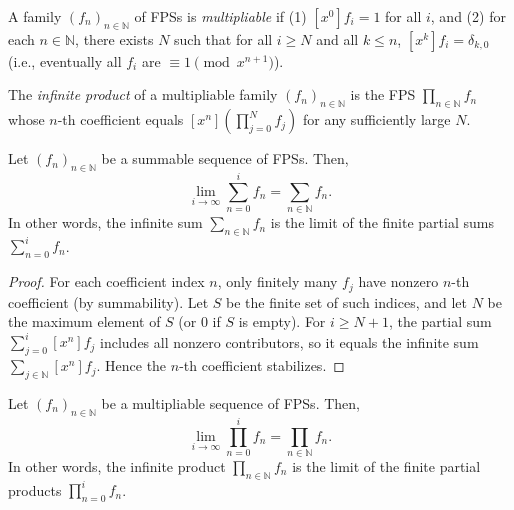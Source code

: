 \begin{definition}
\label{def.fps.lim.isMultipliable}
\leanhelper
\leanok
A family $(f_n)_{n \in \mathbb{N}}$ of FPSs is \emph{multipliable} if
(1) $[x^0]f_i = 1$ for all $i$, and
(2) for each $n \in \mathbb{N}$, there exists $N$ such that for all $i \geq N$
and all $k \leq n$, $[x^k]f_i = \delta_{k,0}$
(i.e., eventually all $f_i$ are $\equiv 1 \pmod{x^{n+1}}$).
\end{definition}

\begin{definition}
\label{def.fps.lim.tprod}
\leanhelper
\leanok
The \emph{infinite product} of a multipliable family $(f_n)_{n \in \mathbb{N}}$
is the FPS $\prod_{n \in \mathbb{N}} f_n$ whose $n$-th coefficient equals
$[x^n](\prod_{j=0}^{N} f_j)$ for any sufficiently large $N$.
\end{definition}

\begin{theorem}
\label{thm.fps.lim.sum-lim}
\leantarget
\leanok
Let $\left(  f_{n}\right)  _{n\in\mathbb{N}}$ be a
summable sequence of FPSs. Then,%
\[
\lim\limits_{i\rightarrow\infty}\sum_{n=0}^{i}f_{n}=\sum_{n\in\mathbb{N}}%
f_{n}.
\]
In other words, the infinite sum $\sum_{n\in\mathbb{N}}f_{n}$ is the limit of
the finite partial sums $\sum_{n=0}^{i}f_{n}$.
\end{theorem}

\begin{proof}
\leanok
For each coefficient index $n$, only finitely many $f_j$ have nonzero $n$-th
coefficient (by summability). Let $S$ be the finite set of such indices, and
let $N$ be the maximum element of $S$ (or $0$ if $S$ is empty). For $i \geq N+1$,
the partial sum $\sum_{j=0}^{i} [x^n]f_j$ includes all nonzero contributors,
so it equals the infinite sum $\sum_{j \in \mathbb{N}} [x^n]f_j$. Hence the
$n$-th coefficient stabilizes.
\end{proof}

\begin{theorem}
\label{thm.fps.lim.prod-lim}
\leantarget
\leanok
Let $\left(  f_{n}\right)  _{n\in\mathbb{N}}$ be a
multipliable sequence of FPSs. Then,%
\[
\lim\limits_{i\rightarrow\infty}\prod_{n=0}^{i}f_{n}=\prod_{n\in\mathbb{N}%
}f_{n}.
\]
In other words, the infinite product $\prod_{n\in\mathbb{N}}f_{n}$ is the
limit of the finite partial products $\prod_{n=0}^{i}f_{n}$.
\end{theorem}

